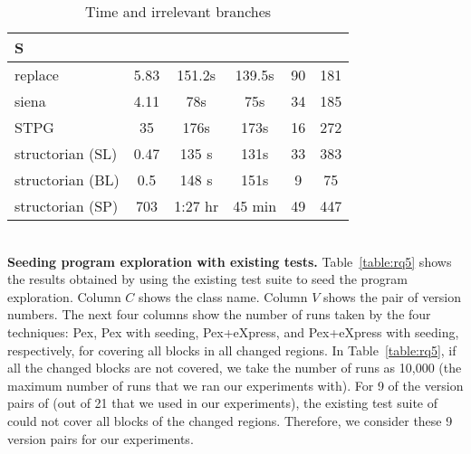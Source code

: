 \begin{table}
\begin{CodeOut}
\begin{center}
\caption {\label{table:all_time}\scriptsize{Time and irrelevant branches}}
\begin {tabular} {|l|c|c|c|c|c|}
\hline
S &\CenterCell{$T_{static}(s)$}&\CenterCell{$T_{Pex}$}&\CenterCell{$T_{eXp}$} &\CenterCell{$B_{Irr}$}&\CenterCell{$B_{Tot}$}\\
\hline
replace&5.83&151.2s&139.5s&90&181\\
\hline
siena&4.11&78s&75s&34&185\\
\hline
STPG&35&176s&173s&16&272\\
\hline
structorian (SL)&0.47&135 s&131s&33&383\\
\hline
structorian (BL)&0.5&148 s&151s&9&75\\
\hline
structorian (SP)&703&1:27 hr&45 min&49&447\\
\hline
\end{tabular}
\end{center}
\end{CodeOut}
\vspace{- 0.5 in}
\end{table}
\\ \textbf{Seeding program exploration with existing tests.} Table~\ref{table:rq5} shows the results obtained by using the existing test suite to seed the program exploration. Column $C$ shows the class name. Column $V$ shows the pair of version numbers. The next four columns show the number of runs taken by the four techniques: Pex, Pex with seeding, Pex+eXpress, and Pex+eXpress with seeding, respectively, for covering all blocks in all changed regions. In Table~\ref{table:rq5}, if all the changed blocks are not covered, we take the number of runs as 10,000 (the maximum number of runs that we ran our experiments with).
For 9 of the version pairs of  (out of 21 that we used in our experiments), the existing test suite of  could not cover all blocks of the changed regions. Therefore, we consider these 9 version pairs for our experiments. 
